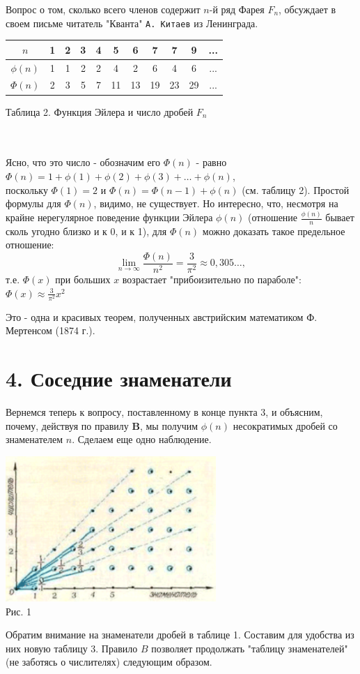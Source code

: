 \begin{multicols*}{2}
{Вопрос о том, сколько всего членов содержит $n$-й ряд Фарея $F_n$, обсуждает в своем письме читатель "Кванта" \texttt{А. Китаев} из Ленинграда.\columnbreak
\begin{center}
\begin{tabular}{|c|cccccccccc|}
\hline
$n$&1&2&3&4&5&6&7&7&9&...\\
\hline
$\phi(n)$&1&1&2&2&4&2&6&4&6&...\\
\hline
$\Phi(n)$&2&3&5&7&11&13&19&23&29&...\\
\hline
\end{tabular}
\end{center}
\caption{Таблица 2. Функция Эйлера и число дробей $F_n$}\\\\Ясно, что это число - обозначим его $\Phi(n)$ - равно\\
$\Phi(n) = 1+\phi(1)+\phi(2)+\phi(3)+\dots+\phi(n)$,\\поскольку $\Phi(1) = 2$ и $\Phi(n) = \Phi(n-1)+\phi(n)$ (см. таблицу 2). Простой формулы для $\Phi(n)$, видимо, не существует. Но интересно, что, несмотря на крайне нерегулярное поведение функции Эйлера $\phi(n)$ (отношение $\displaystyle\frac{\phi(n)}{n}$ бывает сколь угодно близко и к 0, и к 1), для $\Phi(n)$ можно доказать такое предельное отношение:
\[
\lim_{n \to \infty}\frac{\Phi(n)}{n^2} = \frac{3}{\pi^2} \approx 0{,}305\dots,
\]
т.е. $\Phi(x)$ при больших $x$ возрастает "прибоизительно по параболе": $\displaystyle \Phi(x) \approx \frac{3}{\pi^2}x^2$

Это - одна и красивых теорем, полученных австрийским математиком Ф. Мертенсом (1874 г.).
}
\section*{4. Соседние знаменатели}
{\large
Вернемся теперь к вопросу, поставленному в конце пункта 3, и объясним, почему, действуя по правилу \textbf{B}, мы получим $\phi(n)$ несократимых дробей со знаменателем $n$. Сделаем еще одно наблюдение.

\begin{center}
\includegraphics[width=8cm]{risunok.png}\\
\caption{Рис. 1}
\end{center}

Обратим внимание на знаменатели дробей в таблице 1. Составим для удобства из них новую таблицу 3. Правило $B$ позволяет продолжать "таблицу знаменателей" (не заботясь о числителях) следующим образом.
}
\end{multicols*}